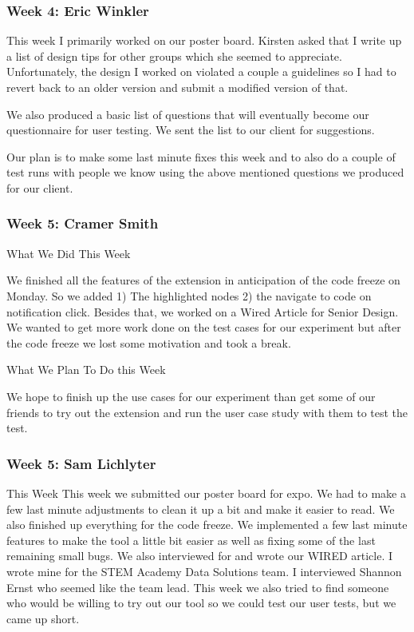 \subsubsection{Week 4: Eric Winkler}

This week I primarily worked on our poster board. Kirsten asked that I write up a list of design tips for other groups which she seemed to appreciate. Unfortunately, the design I worked on violated a couple a guidelines so I had to revert back to an older version and submit a modified version of that.

We also produced a basic list of questions that will eventually become our questionnaire for user testing. We sent the list to our client for suggestions.

Our plan is to make some last minute fixes this week and to also do a couple of test runs with people we know using the above mentioned questions we produced for our client.

\subsubsection{Week 5: Cramer Smith}

What We Did This Week

We finished all the features of the extension in anticipation of the code freeze on Monday. So we added 1) The highlighted nodes 2) the navigate to code on notification click. Besides that, we worked on a Wired Article for Senior Design. We wanted to get more work done on the test cases for our experiment but after the code freeze we lost some motivation and took a break. 

What We Plan To Do this Week

We hope to finish up the use cases for our experiment than get some of our friends to try out the extension and run the user case study with them to test the test. 

\subsubsection{Week 5: Sam Lichlyter}

This Week
This week we submitted our poster board for expo. We had to make a few last minute adjustments to clean it up a bit and make it easier to read. We also finished up everything for the code freeze. We implemented a few last minute features to make the tool a little bit easier as well as fixing some of the last remaining small bugs. We also interviewed for and wrote our WIRED article. I wrote mine for the STEM Academy Data Solutions team. I interviewed Shannon Ernst who seemed like the team lead. This week we also tried to find someone who would be willing to try out our tool so we could test our user tests, but we came up short.

